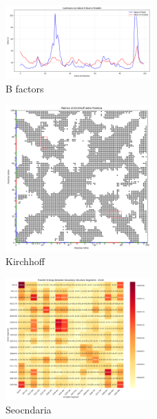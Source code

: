 \documentclass[Lau,binding=0.6cm,oneside,noexaminfo]{sapthesis}
\begin{document}
\begin{figure}[H]
    \centering
    \includegraphics[width=0.5\textwidth]{"images/3LNYConfronto tra Fattori B Reali e Predetti.png"}
    \caption{B factors}
\end{figure}
\begin{figure}[H]
    \centering
    \includegraphics[width=0.5\textwidth]{"images/3LNY_Matrice di Kirchhoff della Proteina.png"}
    \caption{Kirchhoff}
\end{figure}
\begin{figure}[H]
    \centering
    \includegraphics[width=0.5\textwidth]{"images/2m10analyze_secondary_structure_transfer_entropy.png"}
    \caption{Seocndaria}
\end{figure}
\end{document}
